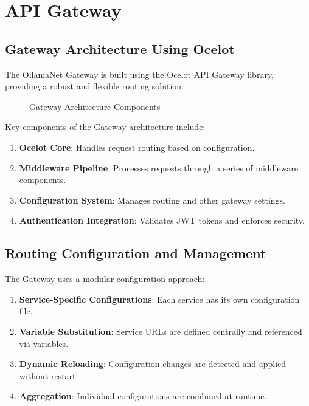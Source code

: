 \section{API Gateway}

\subsection{Gateway Architecture Using Ocelot}

The OllamaNet Gateway is built using the Ocelot API Gateway library, providing a robust and flexible routing solution:

\begin{figure}
    \centering
    \caption{Gateway Architecture Components}
    \label{fig:gateway-components}
\end{figure}

Key components of the Gateway architecture include:

\begin{enumerate}
   \item \textbf{Ocelot Core}: Handles request routing based on configuration.
   \item \textbf{Middleware Pipeline}: Processes requests through a series of middleware components.
   \item \textbf{Configuration System}: Manages routing and other gateway settings.
   \item \textbf{Authentication Integration}: Validates JWT tokens and enforces security.
\end{enumerate}

\subsection{Routing Configuration and Management}

The Gateway uses a modular configuration approach:

\begin{enumerate}
   \item \textbf{Service-Specific Configurations}: Each service has its own configuration file.
   \item \textbf{Variable Substitution}: Service URLs are defined centrally and referenced via variables.
   \item \textbf{Dynamic Reloading}: Configuration changes are detected and applied without restart.
   \item \textbf{Aggregation}: Individual configurations are combined at runtime.
\end{enumerate}

